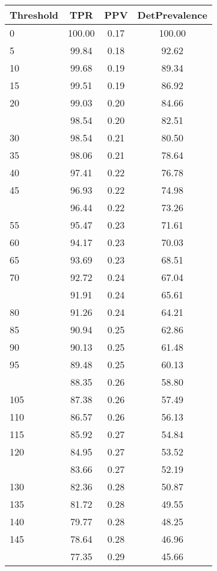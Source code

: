 \begin{table}[ht]
\centering
\begin{tabular}{lccc}
  \toprule
Threshold & TPR & PPV & DetPrevalence \\ 
  \midrule
0 & 100.00 & 0.17 & 100.00 \\ 
  5 & 99.84 & 0.18 & 92.62 \\ 
  10 & 99.68 & 0.19 & 89.34 \\ 
  15 & 99.51 & 0.19 & 86.92 \\ 
  20 & 99.03 & 0.20 & 84.66 \\ 
   \addlinespace
25 & 98.54 & 0.20 & 82.51 \\ 
  30 & 98.54 & 0.21 & 80.50 \\ 
  35 & 98.06 & 0.21 & 78.64 \\ 
  40 & 97.41 & 0.22 & 76.78 \\ 
  45 & 96.93 & 0.22 & 74.98 \\ 
   \addlinespace
50 & 96.44 & 0.22 & 73.26 \\ 
  55 & 95.47 & 0.23 & 71.61 \\ 
  60 & 94.17 & 0.23 & 70.03 \\ 
  65 & 93.69 & 0.23 & 68.51 \\ 
  70 & 92.72 & 0.24 & 67.04 \\ 
   \addlinespace
75 & 91.91 & 0.24 & 65.61 \\ 
  80 & 91.26 & 0.24 & 64.21 \\ 
  85 & 90.94 & 0.25 & 62.86 \\ 
  90 & 90.13 & 0.25 & 61.48 \\ 
  95 & 89.48 & 0.25 & 60.13 \\ 
   \addlinespace
100 & 88.35 & 0.26 & 58.80 \\ 
  105 & 87.38 & 0.26 & 57.49 \\ 
  110 & 86.57 & 0.26 & 56.13 \\ 
  115 & 85.92 & 0.27 & 54.84 \\ 
  120 & 84.95 & 0.27 & 53.52 \\ 
   \addlinespace
125 & 83.66 & 0.27 & 52.19 \\ 
  130 & 82.36 & 0.28 & 50.87 \\ 
  135 & 81.72 & 0.28 & 49.55 \\ 
  140 & 79.77 & 0.28 & 48.25 \\ 
  145 & 78.64 & 0.28 & 46.96 \\ 
   \addlinespace
150 & 77.35 & 0.29 & 45.66 \\ 

\end{tabular}
\end{table}
